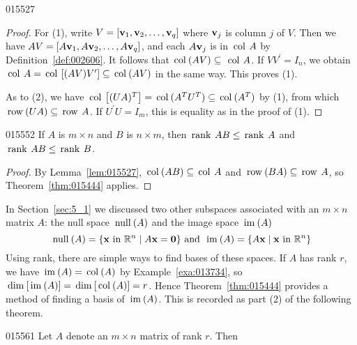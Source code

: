 {{\begin{lemma}{}{015527}
\begin{enumerate}
\end{enumerate}
\end{lemma}

\begin{proof}
For (1), write $V = \left[ \textbf{v}_{1}, \textbf{v}_{2}, \dots, \textbf{v}_{q}\right]$ where $\textbf{v}_{j}$ is column $j$ of $V$. Then we have \newline $AV = \left[ A\textbf{v}_{1}, A\textbf{v}_{2}, \dots, A\textbf{v}_{q}\right]$, and each $A\textbf{v}_{j}$ is in $\thinspace\operatorname{col\medspace} A$ by Definition~\ref{def:002606}. It follows that $\thinspace\operatorname{col\medspace}(AV) \subseteq $
 $\thinspace\operatorname{col\medspace} A$. If $VV^{\prime}=I_{n}$, we obtain $\thinspace\operatorname{col\medspace} A = \thinspace\operatorname{col\medspace}\left[ (AV)V^{\prime} \right] \subseteq \thinspace\operatorname{col\medspace}(AV)$ in the same way. This proves (1).

As to (2), we have $\thinspace\operatorname{col\medspace}\left[ (UA)^{T}\right] = \thinspace\operatorname{col\medspace}(A^{T}U^{T}) \subseteq \thinspace\operatorname{col\medspace}(A^{T})$ by (1), from which $\thinspace\operatorname{row\medspace}(UA) \subseteq \thinspace\operatorname{row\medspace} A$. If $U^{\prime}U=I_{m}$, this is equality as in the proof of (1).
\end{proof}

\begin{corollary}{}{015552}
If $A$ is $m \times n$ and $B$ is $n \times m$, then $\thinspace\operatorname{rank\medspace} AB \leq \thinspace\operatorname{rank\medspace} A$ and $\thinspace\operatorname{rank\medspace} AB \leq \thinspace\operatorname{rank\medspace} B$.
\end{corollary}

\begin{proof}
By Lemma~\ref{lem:015527}, $\thinspace\operatorname{col\medspace}(AB) \subseteq \thinspace\operatorname{col\medspace} A$ and $\thinspace\operatorname{row\medspace}(BA) \subseteq \thinspace\operatorname{row\medspace} A$, so Theorem~\ref{thm:015444} applies.
\end{proof}

In Section~\ref{sec:5_1} we discussed two other subspaces associated with an $m \times n$ matrix $A$: the null space $\thinspace\operatorname{null\medspace}(A)$ and the image space $\thinspace\operatorname{im\medspace}(A)$
\begin{equation*}
\thinspace\operatorname{null\medspace} (A) = \{\textbf{x} \mbox{ in } \mathbb{R}^n \mid A\textbf{x} = \textbf{0} \}
\mbox{ and } \thinspace\operatorname{im\medspace} (A) = \{A\textbf{x} \mid \textbf{x} \mbox{ in } \mathbb{R}^n \}
\end{equation*}
Using rank, there are simple ways to find bases of these spaces. If $A$ has rank $r$, we have $\thinspace\operatorname{im\medspace}(A) = \thinspace\operatorname{col\medspace}(A)$ by Example~\ref{exa:013734}, so $\thinspace\operatorname{dim\medspace}[\thinspace\operatorname{im\medspace}(A)] = \thinspace\operatorname{dim\medspace}[\thinspace\operatorname{col\medspace}(A)] = r$. Hence Theorem~\ref{thm:015444} provides a method of finding a basis of $\thinspace\operatorname{im\medspace}(A)$. This is recorded as part (2) of the following theorem.

\begin{theorem}{}{015561} %
Let $A$ denote an $m \times n$ matrix of rank $r$. Then


\end{theorem}}}
